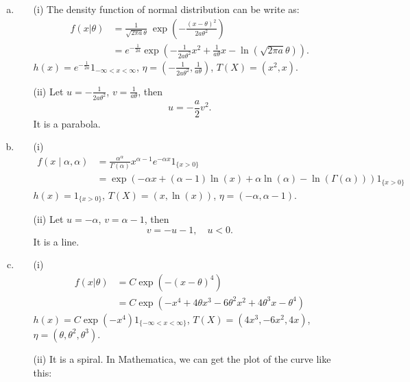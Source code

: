 \begin{solution}
	\begin{enumerate}[(a)]
		\item
		\begin{enumerate}[(a)]
			\item[(i)] The density function of normal distribution can be write as:
			\[
				\begin{aligned}
					f(x|\theta)&={\frac {1}{{\sqrt {2\pi a}\theta}}}\;\exp\left(-{\frac {\left(x-\theta \right)^{2}}{2a\theta^2}}\right)\\
					&=e^{-\frac{1}{2a}}\exp\left(-\frac{1}{2a\theta^2}x^2+\frac{1}{a\theta}x-\ln(\sqrt{2\pi a}\theta)\right).
				\end{aligned}
			\]
			$h(x)=e^{-\frac{1}{2a}}1_{-\infty<x<\infty}$, $\eta=\left(-\frac{1}{2a\theta^2}, \frac{1}{a\theta}\right)$, $T(X)=(x^2, x)$.
			\item[(ii)]
			Let $u=-\frac{1}{2a\theta^2}$, $v=\frac{1}{a\theta}$, then
			\[
				u=-\frac{a}{2}v^2.
			\]
			It is a parabola.
		\end{enumerate}
		\item
		\begin{enumerate}[(a)]
			\item[(i)]
			\[
				\begin{aligned}
					f(x \mid \alpha, \alpha)&=\frac{\alpha^{\alpha}}{\Gamma(\alpha)} x^{\alpha-1} e^{-\alpha x} 1_{\{x>0\}}\\
					&=\exp\left(-\alpha x+(\alpha-1)\ln(x)+\alpha\ln(\alpha)-\ln(\Gamma(\alpha))\right)1_{\{x>0\}}
				\end{aligned}
			\]
			$h(x)=1_{\{x>0\}}$, $T(X)=(x, \ln(x))$, $\eta=(-\alpha,\alpha-1)$.
			\item[(ii)]
			Let $u=-\alpha$, $v=\alpha-1$, then
			\[
				v=-u-1,\quad u<0.
			\]
			It is a line.
		\end{enumerate}
		\item
		\begin{enumerate}[(a)]
			\item[(i)]
			\[
				\begin{aligned}
					f(x|\theta)&=C\exp(-(x-\theta)^4)\\
					&=C\exp\left(-x^4+4\theta x^3-6\theta^2x^2+4\theta^3x-\theta^4\right)
				\end{aligned}
			\]
			$h(x)=C\exp(-x^4)1_{\{-\infty<x<\infty\}}$, $T(X)=(4x^3, -6x^2, 4x)$, $\eta=(\theta, \theta^2, \theta^3)$.
			\item[(ii)] It is a spiral. In Mathematica, we can get the plot of the curve like this:

\end{enumerate}
\end{enumerate}
\end{solution}
